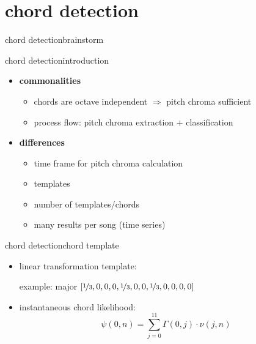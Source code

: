    \section{chord detection}
        \begin{frame}{chord detection}{brainstorm}
        \end{frame}
        \begin{frame}{chord detection}{introduction}

            \begin{itemize}
                \item	\textbf{commonalities}
                    \begin{itemize}
                        \item<2->	chords are octave independent $\Rightarrow$ pitch chroma sufficient
                        \item<2->	process flow: pitch chroma extraction $+$ classification
                    \end{itemize}
                \item<3->	\textbf{differences}
                    \begin{itemize}
                        \item	time frame for pitch chroma calculation
                        \item	templates
                        \item	number of templates/chords
                        \item	many results per song (time series)
                    \end{itemize}
            \end{itemize}
        \end{frame}
        \begin{frame}{chord detection}{chord template}
            \begin{itemize}
                \item	linear transformation template: 
            
                    example: major $[\nicefrac{1}{3},0,0,0,\nicefrac{1}{3},0,0,\nicefrac{1}{3},0,0,0,0]$
                \item	instantaneous chord likelihood:
                \begin{equation*}
                    {\psi}(0,n) = \sum\limits_{j = 0}^{11}{\Gamma(0,j)\cdot \nu(j,n)}
                \end{equation*}
            \end{itemize}	
        \end{frame}
        
